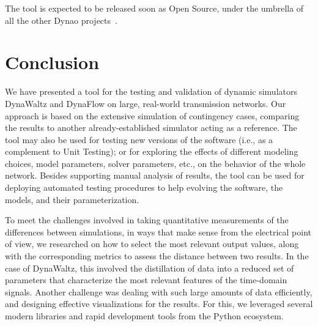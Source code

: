 \documentclass[conference]{IEEEtran}
\newcommand{\Dynawo}{Dyna\textomega o\xspace} %
\begin{document}
The tool is expected to be released soon as Open Source, under the
umbrella of all the other \Dynawo projects~\cite{DwoGitRepos}.




\section{Conclusion}

We have presented a tool for the testing and validation of dynamic
simulators DynaWaltz and DynaFlow on large, real-world transmission
networks.  Our approach is based on the extensive simulation of
contingency cases, comparing the results to another
already-established simulator acting as a reference. The tool may also
be used for testing new versions of the software (i.e., as a
complement to Unit Testing); or for exploring the effects of different
modeling choices, model parameters, solver parameters, etc., on the
behavior of the whole network.  Besides supporting manual analysis of
results, the tool can be used for deploying automated testing
procedures to help evolving the software, the models, and their
parameterization.

To meet the challenges involved in taking quantitative measurements of
the differences between simulations, in ways that make sense from the
electrical point of view, we researched on how to select the most
relevant output values, along with the corresponding metrics to assess
the distance between two results. In the case of DynaWaltz, this
involved the distillation of data into a reduced set of parameters
that characterize the most relevant features of the time-domain
signals.  Another challenge was dealing with such large amounts of
data efficiently, and designing effective visualizations for the
results. For this, we leveraged several modern libraries and rapid
development tools from the Python ecosystem.










\end{document}
